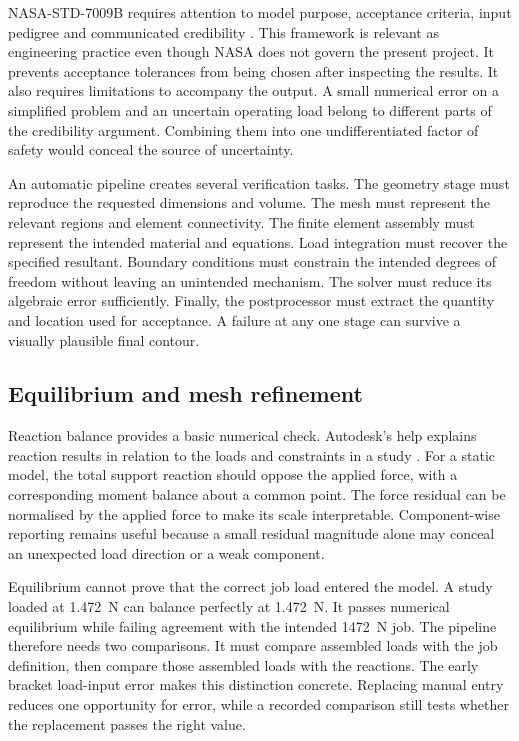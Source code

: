 NASA-STD-7009B requires attention to model purpose, acceptance criteria, input pedigree and communicated credibility \cite{nasa7009}. This framework is relevant as engineering practice even though NASA does not govern the present project. It prevents acceptance tolerances from being chosen after inspecting the results. It also requires limitations to accompany the output. A small numerical error on a simplified problem and an uncertain operating load belong to different parts of the credibility argument. Combining them into one undifferentiated factor of safety would conceal the source of uncertainty.

An automatic pipeline creates several verification tasks. The geometry stage must reproduce the requested dimensions and volume. The mesh must represent the relevant regions and element connectivity. The finite element assembly must represent the intended material and equations. Load integration must recover the specified resultant. Boundary conditions must constrain the intended degrees of freedom without leaving an unintended mechanism. The solver must reduce its algebraic error sufficiently. Finally, the postprocessor must extract the quantity and location used for acceptance. A failure at any one stage can survive a visually plausible final contour.

\subsection{Equilibrium and mesh refinement}
\label{sec:lit-convergence}

Reaction balance provides a basic numerical check. Autodesk's help explains reaction results in relation to the loads and constraints in a study \cite{autodeskReaction}. For a static model, the total support reaction should oppose the applied force, with a corresponding moment balance about a common point. The force residual can be normalised by the applied force to make its scale interpretable. Component-wise reporting remains useful because a small residual magnitude alone may conceal an unexpected load direction or a weak component.

Equilibrium cannot prove that the correct job load entered the model. A study loaded at 1.472~N can balance perfectly at 1.472~N. It passes numerical equilibrium while failing agreement with the intended 1472~N job. The pipeline therefore needs two comparisons. It must compare assembled loads with the job definition, then compare those assembled loads with the reactions. The early bracket load-input error makes this distinction concrete. Replacing manual entry reduces one opportunity for error, while a recorded comparison still tests whether the replacement passes the right value.


